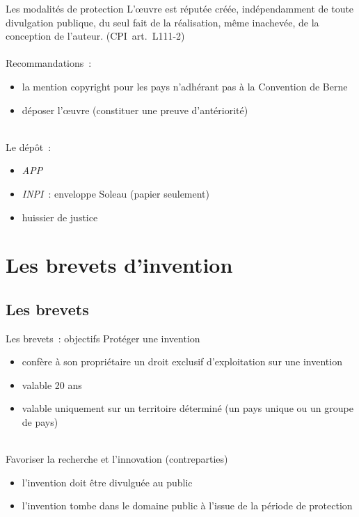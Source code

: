 \documentclass{beamer}
\begin{document}
\begin{frame}{Les modalités de protection}
    \og{}L'œuvre est réputée créée, indépendamment de toute divulgation
    publique, du seul fait de la réalisation, même inachevée, de
    la conception de l'auteur.\fg{} (CPI~art.~L111-2)\\
    ~\\
    Recommandations~:
    \begin{itemize}
        \item la mention copyright pour les pays n'adhérant pas à la Convention de Berne
        \item déposer l'œuvre (constituer une preuve d'antériorité)
    \end{itemize}
    ~\\
    Le dépôt~:
    \begin{itemize}
        \item \emph{APP}
        \item \emph{INPI}~: enveloppe Soleau (papier seulement)
        \item huissier de justice
    \end{itemize}
\end{frame}


\section{Les brevets d'invention}

\subsection{Les brevets}

\begin{frame}{Les brevets~: objectifs}
    Protéger une invention
    \begin{itemize}
        \item confère à son propriétaire un droit exclusif d’exploitation
              sur une invention
        \item valable 20 ans
        \item valable uniquement sur un territoire déterminé (un pays unique
              ou un groupe de pays)
    \end{itemize}
    ~\\
    Favoriser la recherche et l'innovation (contreparties)
    \begin{itemize}
        \item l'invention doit être divulguée au public
        \item l'invention tombe dans le domaine public à l'issue de la
              période de protection
    \end{itemize}
\end{frame}
\end{document}
